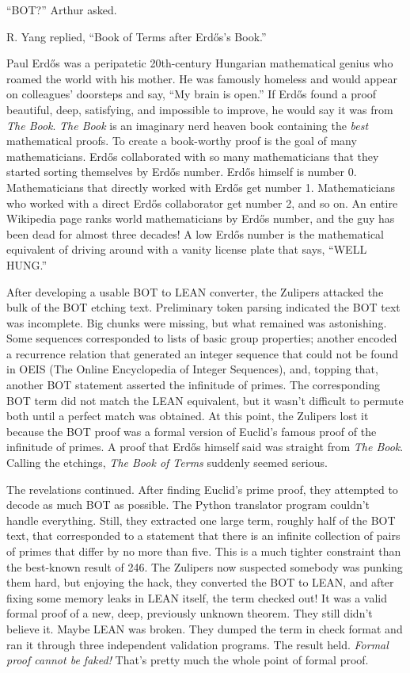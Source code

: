 ``BOT?'' Arthur asked.

R. Yang replied, ``Book of Terms after Erdős's Book.''

Paul Erdős was a peripatetic 20th-century Hungarian mathematical genius
who roamed the world with his mother. He was famously homeless and would
appear on colleagues' doorsteps and say, ``My brain is open.'' If Erdős
found a proof beautiful, deep, satisfying, and impossible to improve, he
would say it was from \emph{The Book}. \emph{The Book} is an imaginary
nerd heaven book containing the \emph{best} mathematical proofs. To
create a book-worthy proof is the goal of many mathematicians. Erdős
collaborated with so many mathematicians that they started sorting
themselves by Erdős number. Erdős himself is number 0. Mathematicians
that directly worked with Erdős get number 1. Mathematicians who worked
with a direct Erdős collaborator get number 2, and so on. An entire
Wikipedia page ranks world mathematicians by Erdős number, and the guy
has been dead for almost three decades! A low Erdős number is the
mathematical equivalent of driving around with a vanity license plate
that says, ``WELL HUNG.''

After developing a usable BOT to LEAN converter, the Zulipers attacked
the bulk of the BOT etching text. Preliminary token parsing indicated
the BOT text was incomplete. Big chunks were missing, but what remained
was astonishing. Some sequences corresponded to lists of basic group
properties; another encoded a recurrence relation that generated an
integer sequence that could not be found in OEIS (The Online
Encyclopedia of Integer Sequences), and, topping that, another BOT
statement asserted the infinitude of primes. The corresponding BOT term
did not match the LEAN equivalent, but it wasn't difficult to permute
both until a perfect match was obtained. At this point, the Zulipers
lost it because the BOT proof was a formal version of Euclid's famous
proof of the infinitude of primes. A proof that Erdős himself said was
straight from \emph{The Book}. Calling the etchings, \emph{The Book of
Terms} suddenly seemed serious.

The revelations continued. After finding Euclid's prime proof, they
attempted to decode as much BOT as possible. The Python translator
program couldn't handle everything. Still, they extracted one large
term, roughly half of the BOT text, that corresponded to a statement
that there is an infinite collection of pairs of primes that differ by
no more than five. This is a much tighter constraint than the best-known
result of 246. The Zulipers now suspected somebody was punking them
hard, but enjoying the hack, they converted the BOT to LEAN, and after
fixing some memory leaks in LEAN itself, the term checked out! It was a
valid formal proof of a new, deep, previously unknown theorem. They
still didn't believe it. Maybe LEAN was broken. They dumped the term in
check format and ran it through three independent validation programs.
The result held. \emph{Formal proof cannot be faked!} That's pretty much
the whole point of formal proof.

